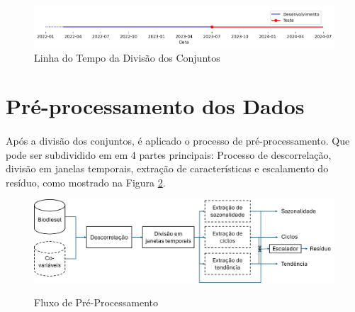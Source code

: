 \begin{figure}
	\begin{center}
		\begin{center}
			\includegraphics[width=\textwidth]{figuras/series_conjunto_timeline.png}
			\caption{Linha do Tempo da Divisão dos Conjuntos}
			\label{fig:series_conjunto_timeline}
		\end{center}

	\end{center}
\end{figure}


\section{Pré-processamento dos Dados}
\paragraph{} Após a divisão dos conjuntos, é aplicado o processo de pré-processamento. Que pode ser subdividido em em 4 partes principais: Processo de descorrelação, divisão em janelas temporais, extração de características e escalamento do resíduo, como mostrado na Figura \ref{fig:preprocessamento_diagram}.

\begin{figure}
	\begin{center}
		\begin{center}
			\includegraphics[width=\textwidth]{figuras/preprocessamento_diagram.png}
			 \\
			\caption{Fluxo de Pré-Processamento}
			\label{fig:preprocessamento_diagram}
		\end{center}

	\end{center}
\end{figure}

